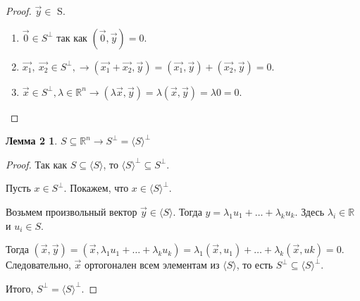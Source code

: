 \documentclass[a4paper, 12pt]{article}
\newtheorem*{que52lemma2}{Лемма 2}
\begin{document}
\begin{proof}
$\vec{y} \in $ S.
\begin{enumerate}
\item $\vec{0} \in S^{\perp}$ так как $(\vec{0},\vec{y})=0$.
\item $\vec{x_{1}},\ \vec{x_{2}} \in S^{\perp},  \rightarrow (\vec{x_{1}}+\vec{x_{2}},\vec{y})=(\vec{x_{1}},\vec{y})+(\vec{x_{2}},\vec{y})=0$.
\item $\vec{x} \in S^{\perp}, \lambda \in \mathbb{R}^n \rightarrow (\lambda \vec{x} , \vec{y}) = \lambda (\vec{x}, \vec{y}) = \lambda 0 = 0.$
\end{enumerate}
\end{proof}

\begin{que52lemma2}
$ S \subseteq \mathbb{R}^n \rightarrow S^{\perp} = \langle S \rangle^{\perp}$
\end{que52lemma2}

\begin{proof}
Так как $S \subseteq \langle S\rangle$, то $\langle S\rangle^{\perp} \subseteq S^{\perp}$.

Пусть $x \in S^{\perp}$. Покажем, что $x \in \langle S\rangle^{\perp}$.

Возьмем произвольный вектор $\vec{y} \in \langle S\rangle$. Тогда $y=\lambda_{1}u_{1}+\dots+\lambda_{k}u_{k}$.
Здесь $\lambda_{i} \in \mathbb{R}$ и $u_{i} \in S$.

Тогда $(\vec{x},\vec{y}) = (\vec{x},\lambda_{1}u_{1} + \dots + \lambda_{k}u_{k})=\lambda_{1}(\vec{x},u_{1}) + \dots + \lambda_{k}(\vec{x},u{k}) = 0$. Следовательно,  $\vec{x}$ ортогонален всем элементам из $\langle S\rangle$, то есть $S^{\perp} \subseteq \langle S\rangle^{\perp}$.

Итого, $S^{\perp} = \langle S\rangle^{\perp}$.
\end{proof}

\end{document}
